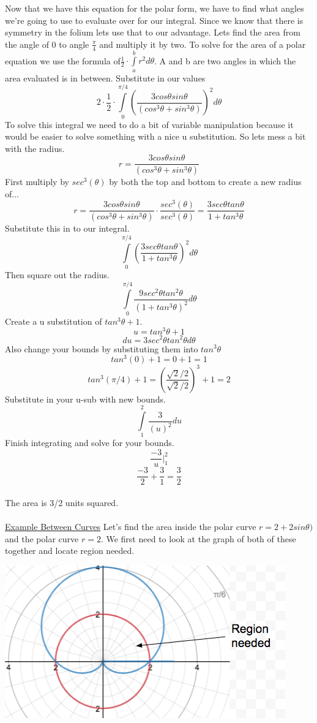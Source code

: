 \documentclass[a4paper,openright, 14pt]{article}
\begin{document}
Now that we have this equation for the polar form, we have to find what angles we're going to use to evaluate over for our integral. Since we know that there is symmetry in the folium lets use that to our advantage. Lets find the area from the angle of 0 to angle $\frac{\pi}{4}$ and multiply it by two. To solve for the area of a polar equation we use the formula of$\frac{1}{2}\cdot \int\limits_a ^b r^2 d\theta$. A and b are two angles in which the area evaluated is in between. Substitute in our values
$$2\cdot \frac{1}{2}\cdot  \int\limits_0 ^{\pi/4} (\frac{3 cos\theta sin\theta}{(cos^3 \theta +sin^3\theta)})^2 d\theta$$
To solve this integral we need to do a bit of variable manipulation because it would be easier to solve something with a nice u substitution. So lets mess a bit with the radius.
$$r=\frac{3 cos\theta sin\theta}{(cos^3 \theta +sin^3\theta)}$$
First multiply by $sec^3(\theta)$ by both the top and bottom to create a new radius of...
$$r=\frac{3 cos\theta sin\theta}{(cos^3 \theta +sin^3\theta)} \cdot \frac{sec^3(\theta)}{sec^3(\theta)}=\frac{3sec\theta tan\theta}{1+tan^3 \theta}$$
Substitute this in to our integral.
$$ \int\limits_0 ^{\pi/4} (\frac{3sec\theta tan\theta}{1+tan^3 \theta})^2 d\theta$$
Then square out the radius.
$$ \int\limits_0 ^{\pi/4} \frac{9sec^2\theta tan^2\theta}{(1+tan^3 \theta)^2} d\theta$$
Create a u substitution of $tan^3\theta + 1$.
$$u=tan^3 \theta +1$$
$$du=3sec^2\theta tan^2\theta d\theta$$
Also change your bounds by substituting them  into $tan^3 \theta$
$$tan^3(0)+1=0+1=1$$
$$tan^3(\pi /4)+1=(\frac{\sqrt{2}/2}{\sqrt{2}/2})^3+1=2$$
Substitute in your u-sub with new bounds.
$$ \int\limits_1 ^{2} \frac{3}{(u)^2} du$$
Finish integrating and solve for your bounds.
$$\frac{-3}{u}|_1 ^2$$
$$\frac{-3}{2}+\frac{3}{1}=\frac{3}{2}$$
\\
The area is 3/2 units squared.\\\\
\underline{Example Between Curves}
Let's find the area inside the polar curve $r=2+2sin\theta)$ and the polar curve $r=2$. We first need to look at the graph of both of these together and locate region needed.\\
\begin{center}
\includegraphics[width = 14 cm, height = 7 cm]{JOSH3.png}
\end{center}
\end{document}
